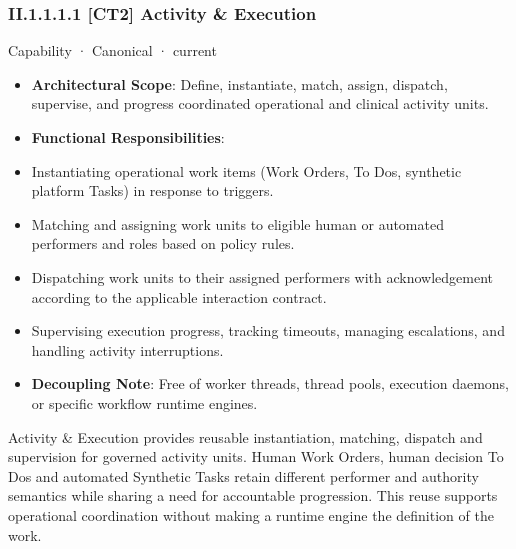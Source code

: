 \subsubsection*{II.1.1.1.1 [CT2] Activity \& Execution}
\label{navigation:II.1.1.1.1}

\label{element:e5ff80e655084524a8dcee8e4ded788a}
{\small Capability · Canonical · current}\par

\begin{itemize}


\item \textbf{Architectural Scope}: Define, instantiate, match, assign, dispatch, supervise, and progress coordinated operational and clinical activity units.

\item \textbf{Functional Responsibilities}:

\item Instantiating operational work items (Work Orders, To Dos, synthetic platform Tasks) in response to triggers.

\item Matching and assigning work units to eligible human or automated performers and roles based on policy rules.

\item Dispatching work units to their assigned performers with acknowledgement according to the applicable interaction contract.

\item Supervising execution progress, tracking timeouts, managing escalations, and handling activity interruptions.

\item \textbf{Decoupling Note}: Free of worker threads, thread pools, execution daemons, or specific workflow runtime engines.

\end{itemize}


Activity \& Execution provides reusable instantiation, matching, dispatch and supervision for governed activity units. Human Work Orders, human decision To Dos and automated Synthetic Tasks retain different performer and authority semantics while sharing a need for accountable progression. This reuse supports operational coordination without making a runtime engine the definition of the work.



